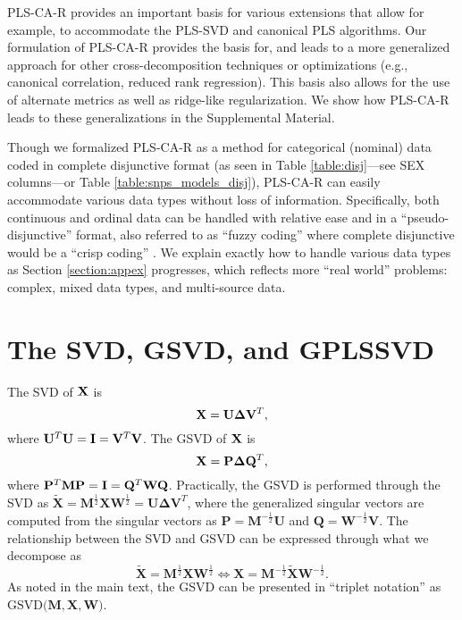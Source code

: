 \documentclass[12pt]{article}
\begin{document}
PLS-CA-R provides an important basis for various extensions that allow
for example, to accommodate the PLS-SVD and canonical PLS algorithms.
Our formulation of PLS-CA-R provides the basis for, and leads to a more
generalized approach for other cross-decomposition techniques or
optimizations (e.g., canonical correlation, reduced rank regression).
This basis also allows for the use of alternate metrics as well as
ridge-like regularization. We show how PLS-CA-R leads to these
generalizations in the Supplemental Material.

Though we formalized PLS-CA-R as a method for categorical (nominal) data
coded in complete disjunctive format (as seen in Table
\ref{table:disj}---see SEX columns---or Table
\ref{table:snps_models_disj}), PLS-CA-R can easily accommodate various
data types without loss of information. Specifically, both continuous
and ordinal data can be handled with relative ease and in a
``pseudo-disjunctive'' format, also referred to as ``fuzzy coding''
where complete disjunctive would be a ``crisp coding''
\citep{greenacrefuzzy}. We explain exactly how to handle various data
types as Section \ref{section:appex} progresses, which reflects more
``real world'' problems: complex, mixed data types, and multi-source
data.

\hypertarget{the-svd-gsvd-and-gplssvd}{%
\section{The SVD, GSVD, and GPLSSVD}\label{the-svd-gsvd-and-gplssvd}}

The SVD of \({\bf X}\) is \begin{equation}
{\bf X} = {\bf U}{\boldsymbol \Delta}{\bf V}^{T},
\end{equation} where
\({\bf U}^{T}{\bf U} = {\bf I} = {\bf V}^{T}{\bf V}\). The GSVD of
\({\bf X}\) is \begin{equation}
{\bf X} = {\bf P}{\boldsymbol \Delta}{\bf Q}^{T},
\end{equation} where
\({\bf P}^{T}{\bf M}{\bf P} = {\bf I} = {\bf Q}^{T}{\bf W}{\bf Q}\).
Practically, the GSVD is performed through the SVD as
\(\widetilde{\mathbf X} = {\mathbf M}^{\frac{1}{2}}{\mathbf X}{\mathbf W}^{\frac{1}{2}} = {\mathbf U} {\boldsymbol \Delta} {\mathbf V}^{T}\),
where the generalized singular vectors are computed from the singular
vectors as \({\mathbf P} = {\mathbf M}^{-\frac{1}{2}}{\mathbf U}\) and
\({\mathbf Q} = {\mathbf W}^{-\frac{1}{2}}{\mathbf V}\). The
relationship between the SVD and GSVD can be expressed through what we
decompose as \begin{equation}
\widetilde{\mathbf X} = {\mathbf M}^{\frac{1}{2}}{\mathbf X}{\mathbf W}^{\frac{1}{2}} \Longleftrightarrow {\mathbf X} = {\mathbf M}^{-\frac{1}{2}}\widetilde{\mathbf X}{\mathbf W}^{-\frac{1}{2}}.
\end{equation} As noted in the main text, the GSVD can be presented in
``triplet notation'' as
\(\mathrm{GSVD(}{\mathbf M}, {\mathbf X}, {\mathbf W}\mathrm{)}\).
\end{document}
